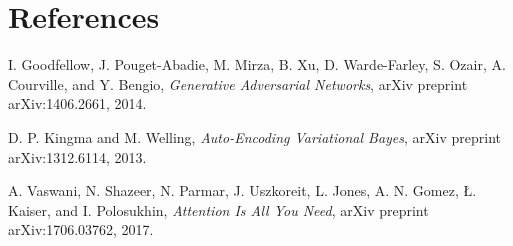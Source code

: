 \chapter{References}


% 
% 

\begin{thebibliography}{99}

I. Goodfellow, J. Pouget-Abadie, M. Mirza, B. Xu, D. Warde-Farley, S. Ozair, A. Courville, and Y. Bengio,
\textit{Generative Adversarial Networks},
arXiv preprint arXiv:1406.2661, 2014.

D. P. Kingma and M. Welling,
\textit{Auto-Encoding Variational Bayes},
arXiv preprint arXiv:1312.6114, 2013.

A. Vaswani, N. Shazeer, N. Parmar, J. Uszkoreit, L. Jones, A. N. Gomez, Ł. Kaiser, and I. Polosukhin,
\textit{Attention Is All You Need},
arXiv preprint arXiv:1706.03762, 2017.


\end{thebibliography}
